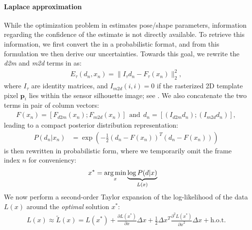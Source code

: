 

\paragraph{Laplace approximation}
\label{sec:posterior}
While the optimization problem in  estimates pose/shape parameters, information regarding the confidence of the estimate is not directly available. To retrieve this information, we first convert the  in a probabilistic format, and from this formulation we then derive our uncertainties. 
% 
Towards this goal, we rewrite the \emph{d2m} and \emph{m2d} terms in  as:
% 
\begin{align}
E_{\tau}(d_n, x_n) = \|I_{\tau} d_n - F_{\tau} (x_n)\|_2^2,
\end{align} 
where $I_\tau$ are identity matrices, and $I_{m2d}(i,i)=0$ if the rasterized 2D template pixel $\mathbf{p}_i$ lies within the sensor silhouette image; see \cite{htrack}. We also concatenate the two terms in pair of column vectors:
% 
\begin{align*}
F(x_n) = \left[F_{d2m}(x_n); F_{m2d}(x_n)\right] 
\:\:\text{and}\:\: 
d_n = \left[(I_{d2m} d_n); (I_{m2d} d_n) \right],
\end{align*}
% 
leading to a compact posterior distribution representation:
% 
\begin{align}
P(d_n|x_n) &= \exp \left( - \tfrac{1}{2}(d_n - F(x_n))^T (d_n - F(x_n)) \right)
\label{eq:posterior}
\end{align}
% 
 is then rewritten in probabilistic form, where we temporarily omit the frame index $n$ for conveniency:
%
\begin{align}
x^* &= \operatorname*{arg\,min}_{x} \underbrace{\log  P(d|x)}_{L(x)}
\label{eq:independent}
\end{align}
%
We now perform a second-order Taylor expansion of the log-likelihood of the data $L(x)$ around the \emph{optimal} solution $x^*$:
%
\begin{align}
L(x) \approx \tilde{L}(x) = L(x^*)   
+ \tfrac{\partial L(x^*) }{\partial x}  \Delta x 
+ \tfrac{1}{2} \Delta x^T\tfrac{\partial^2 L(x^*)}{{\partial x}^2} \Delta x + \text{h.o.t.}
\label{eq:taylor}
\end{align}
